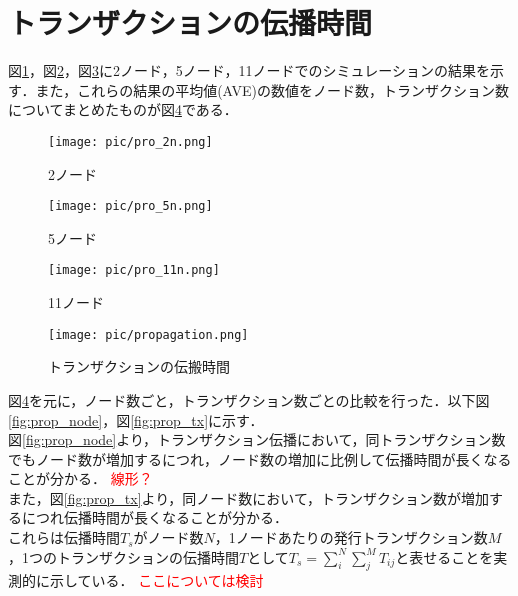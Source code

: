 \documentclass[japanese, macos]{KU2}
\begin{document}
\section{トランザクションの伝播時間}
図\ref{fig:pro_2n}，図\ref{fig:pro_5n}，図\ref{fig:pro_11n}に2ノード，5ノード，11ノードでのシミュレーションの結果を示す．また，これらの結果の平均値(AVE)の数値をノード数，トランザクション数についてまとめたものが図\ref{fig:propagation}である．
\begin{figure}[htbp]
  \begin{center} 
    \texttt{[image: pic/pro\_2n.png]}
    \caption{2ノード}
    \label{fig:pro_2n} 
  \end{center}
\end{figure}
\begin{figure}[htbp]
  \begin{center} 
    \texttt{[image: pic/pro\_5n.png]}
    \caption{5ノード}
    \label{fig:pro_5n} 
  \end{center}
\end{figure}
\begin{figure}[htbp]
  \begin{center} 
    \texttt{[image: pic/pro\_11n.png]}
    \caption{11ノード}
    \label{fig:pro_11n} 
  \end{center}
\end{figure}
\begin{figure}[htbp]
  \begin{center} 
    \texttt{[image: pic/propagation.png]}
    \caption{トランザクションの伝搬時間}
    \label{fig:propagation} 
  \end{center}
\end{figure}

図\ref{fig:propagation}を元に，ノード数ごと，トランザクション数ごとの比較を行った．以下図\ref{fig:prop_node}，図\ref{fig:prop_tx}に示す．\\
図\ref{fig:prop_node}より，トランザクション伝播において，同トランザクション数でもノード数が増加するにつれ，ノード数の増加に比例して伝播時間が長くなることが分かる．
\textcolor{red}{線形？}\\
また，図\ref{fig:prop_tx}より，同ノード数において，トランザクション数が増加するにつれ伝播時間が長くなることが分かる．\\
これらは伝播時間$T_s$がノード数$N$，1ノードあたりの発行トランザクション数$M$，1つのトランザクションの伝播時間$T$として$T_s=\sum ^{N}_{i}\sum ^{M}_{j}T_{ij}$と表せることを実測的に示している．
\textcolor{red}{ここについては検討}
\end{document}
